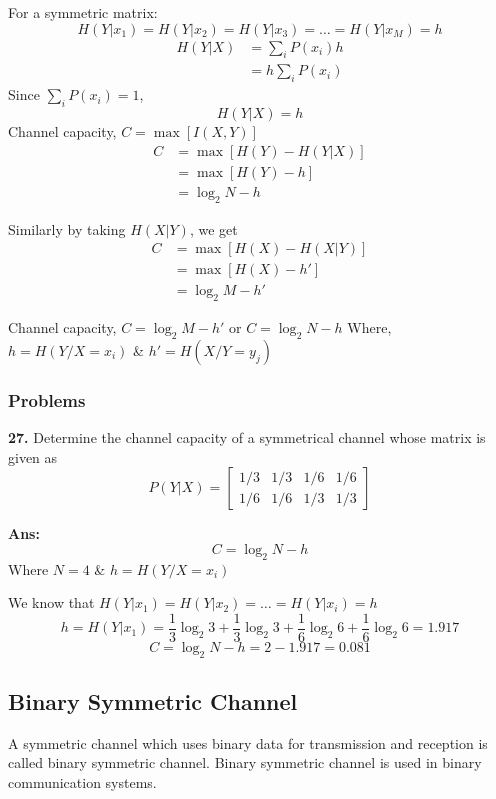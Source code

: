 \documentclass[12pt]{article}
\begin{document}
For a symmetric matrix: 
$$H(Y|x_1) = H(Y|x_2) = H(Y|x_3) = \dots = H(Y|x_M) = h$$ 
\begin{align*}
H(Y|X) &= \sum_i P(x_i)h \\
&= h \sum_i P(x_i)
\end{align*} 
Since $\sum_i P(x_i) = 1$, 
$$H(Y|X) = h$$ 
Channel capacity, $C = \max[I(X,Y)]$ 
\begin{align*}
C &= \max[H(Y) - H(Y|X)] \\
&= \max[H(Y) - h] \\
&= \log_2 N - h
\end{align*} 

Similarly by taking $H(X|Y)$, we get 
\begin{align*}
C &= \max[H(X) - H(X|Y)] \\
&= \max[H(X) - h'] \\
&= \log_2 M - h'
\end{align*} 

Channel capacity, $C = \log_2 M - h'$ or $C = \log_2 N - h$ 
Where, $h = H(Y/X=x_i)$ \& $h' = H(X/Y=y_j)$ 

\subsubsection*{Problems}
\textbf{27.} Determine the channel capacity of a symmetrical channel whose matrix is given as 
$$P(Y|X) = \begin{bmatrix}
1/3 & 1/3 & 1/6 & 1/6 \\ 
1/6 & 1/6 & 1/3 & 1/3
\end{bmatrix}$$ 

\textbf{Ans:}
$$C = \log_2 N - h$$ 
Where $N=4$ \& $h = H(Y/X=x_i)$ 

We know that $H(Y|x_1) = H(Y|x_2) = \dots = H(Y|x_i) = h$ 
$$h = H(Y|x_1) = \frac{1}{3}\log_2 3 + \frac{1}{3}\log_2 3 + \frac{1}{6}\log_2 6 + \frac{1}{6}\log_2 6 = 1.917$$ 
$$C = \log_2 N - h = 2 - 1.917 = 0.081$$ 

\subsection{Binary Symmetric Channel}
A symmetric channel which uses binary data for transmission and reception is called binary symmetric channel. 
Binary symmetric channel is used in binary communication systems. 
\end{document}
